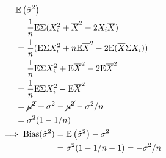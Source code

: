 \documentclass[twocolumn]{article}
\numberwithin{equation}{section}
\begin{document}
\subsection{}
\begin{gather*}
\begin{aligned}
&\mathbb{E}\left(\hat{\sigma}^2\right)\\
&=\frac{1}{n}\mathrm{E}\Sigma(X_i^2+\overline X^2-2X_i\overline X)\\
&=\frac{1}{n}(\mathrm{E}\Sigma X_i^2+n\mathrm{E}\overline X^2-2\mathrm{E}(\overline X\Sigma X_i))\\
&=\frac{1}{n}\mathrm{E}\Sigma X_i^2+\mathrm{E}\overline X^2-2\mathrm{E}\overline X^2\\
&=\frac{1}{n}\mathrm{E}\Sigma X_i^2-\mathrm{E}\overline X^2\\
&=\cancel{\mu^2}+\sigma^2-\cancel{\mu^2}-\sigma^2/n\\
&=\sigma^2(1-1/n)\\
\end{aligned}\\
\begin{aligned}
\implies \mathrm{Bias}(\hat\sigma^2)&=\mathbb{E}\left(\hat\sigma^2\right)-\sigma^2\\
&=\sigma^2(1-1/n-1)=-\sigma^2/n
\end{aligned}
\end{gather*}

\subsection{}


\end{document}
